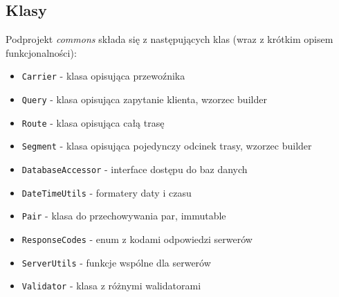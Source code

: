 \documentclass[pdftex,13pt,a4paper]{article}
\begin{document}
\subsection{Klasy}
Podprojekt \textit{commons} składa się z następujących klas (wraz z krótkim opisem funkcjonalności):
\begin{itemize}

\item \texttt{Carrier} - klasa opisująca przewoźnika
\item \texttt{Query} - klasa opisująca zapytanie klienta, wzorzec builder
\item \texttt{Route} - klasa opisująca całą trasę
\item \texttt{Segment} - klasa opisująca pojedynczy odcinek trasy, wzorzec builder
\item \texttt{DatabaseAccessor} - interface dostępu do baz danych
\item \texttt{DateTimeUtils} - formatery daty i czasu
\item \texttt{Pair} - klasa do przechowywania par, immutable
\item \texttt{ResponseCodes} - enum z kodami odpowiedzi serwerów
\item \texttt{ServerUtils} - funkcje wspólne dla serwerów
\item \texttt{Validator} - klasa z różnymi walidatorami
\end{itemize}
\end{document}
